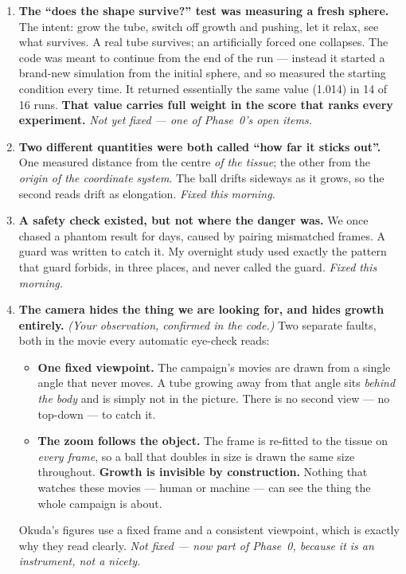 \documentclass[11pt,a4paper]{article}
\begin{document}
\begin{enumerate}[leftmargin=1.4em]
\item \textbf{The ``does the shape survive?'' test was measuring a fresh sphere.}
The intent: grow the tube, switch off growth and pushing, let it relax, see what survives. A real
tube survives; an artificially forced one collapses. The code was meant to continue from the end of
the run --- instead it started a brand-new simulation from the initial sphere, and so measured the
starting condition every time. It returned essentially the same value (1.014) in 14 of 16 runs.
\textbf{That value carries full weight in the score that ranks every experiment.}
\emph{Not yet fixed --- one of Phase~0's open items.}

\item \textbf{Two different quantities were both called ``how far it sticks out''.}
One measured distance from the centre \emph{of the tissue}; the other from the \emph{origin of the
coordinate system}. The ball drifts sideways as it grows, so the second reads drift as elongation.
\emph{Fixed this morning.}

\item \textbf{A safety check existed, but not where the danger was.}
We once chased a phantom result for days, caused by pairing mismatched frames. A guard was written
to catch it. My overnight study used exactly the pattern that guard forbids, in three places, and
never called the guard. \emph{Fixed this morning.}

\item \textbf{The camera hides the thing we are looking for, and hides growth entirely.}
\emph{(Your observation, confirmed in the code.)} Two separate faults, both in the movie every
automatic eye-check reads:
\begin{itemize}
\item \textbf{One fixed viewpoint.} The campaign's movies are drawn from a single angle that never
moves. A tube growing away from that angle sits \emph{behind the body} and is simply not in the
picture. There is no second view --- no top-down --- to catch it.
\item \textbf{The zoom follows the object.} The frame is re-fitted to the tissue on \emph{every
frame}, so a ball that doubles in size is drawn the same size throughout. \textbf{Growth is
invisible by construction.} Nothing that watches these movies --- human or machine --- can see the
thing the whole campaign is about.
\end{itemize}
Okuda's figures use a fixed frame and a consistent viewpoint, which is exactly why they read
clearly. \emph{Not fixed --- now part of Phase~0, because it is an instrument, not a nicety.}
\end{enumerate}
\end{document}
